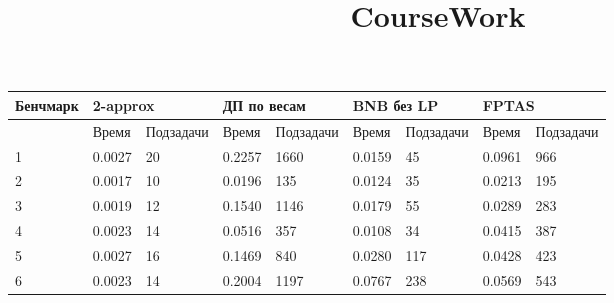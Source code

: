 \documentclass{article}
\title{CourseWork}
\author{}
\date{}
\begin{document}
\setlength{\parindent}{35pt}
\setlength{\footnotemargin}{5pt}
\sloppy
\frenchspacing %



\begin{table}[!h]
    \begin{center}
        \begin{tabular}{ | m{4.1em} | m{3em} | m{4.5em} | m{3em} | m{4.5em} | m{3em} | m{4.5em}| m{3em} | m{4.5em}|}
            \hline
            Бенчмарк & \multicolumn{2}{p{7.5em}|}{2-approx} & \multicolumn{2}{p{7.5em}|}{ДП по весам} & \multicolumn{2}{p{7.5em}|}{BNB без LP} & \multicolumn{2}{p{7.5em}|}{FPTAS}                                           \\
            \hline
                     & Время                                & Подзадачи                               & Время                                  & Подзадачи                         & Время  & Подзадачи & Время  & Подзадачи \\
            \hline
            1        & 0.0027                               & 20                                      & 0.2257                                 & 1660                              & 0.0159 & 45        & 0.0961 & 966       \\
            \hline
            2        & 0.0017                               & 10                                      & 0.0196                                 & 135                               & 0.0124 & 35        & 0.0213 & 195       \\
            \hline
            3        & 0.0019                               & 12                                      & 0.1540                                 & 1146                              & 0.0179 & 55        & 0.0289 & 283       \\
            \hline
            4        & 0.0023                               & 14                                      & 0.0516                                 & 357                               & 0.0108 & 34        & 0.0415 & 387       \\
            \hline
            5        & 0.0027                               & 16                                      & 0.1469                                 & 840                               & 0.0280 & 117       & 0.0428 & 423       \\
            \hline
            6        & 0.0023                               & 14                                      & 0.2004                                 & 1197                              & 0.0767 & 238       & 0.0569 & 543       \\

\end{tabular}
\end{center}
\end{table}
\end{document}
